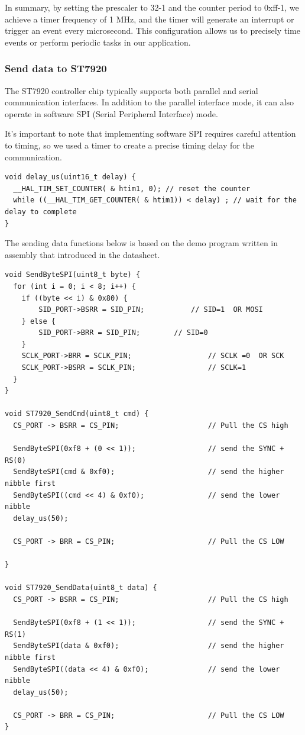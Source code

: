 \documentclass[a4paper, twoside]{report}
\begin{document}
In summary, by setting the prescaler to 32-1 and the counter period to 0xff-1, we achieve a timer frequency of 1 MHz, and the timer will generate an interrupt or trigger an event every microsecond. This configuration allows us to precisely time events or perform periodic tasks in our application.

\subsubsection{Send data to ST7920}
The ST7920 controller chip typically supports both parallel and serial communication interfaces. In addition to the parallel interface mode, it can also operate in software SPI (Serial Peripheral Interface) mode.

It's important to note that implementing software SPI requires careful attention to timing, so we used a timer to create a precise timing delay for the communication.
\begin{verbatim}
void delay_us(uint16_t delay) {
  __HAL_TIM_SET_COUNTER( & htim1, 0); // reset the counter
  while ((__HAL_TIM_GET_COUNTER( & htim1)) < delay) ; // wait for the delay to complete
}
\end{verbatim}

The sending data functions below is based on the demo program written in assembly that introduced in the datasheet. 
\begin{verbatim}
void SendByteSPI(uint8_t byte) {
  for (int i = 0; i < 8; i++) {
    if ((byte << i) & 0x80) {
    	SID_PORT->BSRR = SID_PIN;           // SID=1  OR MOSI
    } else {
    	SID_PORT->BRR = SID_PIN;        // SID=0
    }
    SCLK_PORT->BRR = SCLK_PIN;                  // SCLK =0  OR SCK
    SCLK_PORT->BSRR = SCLK_PIN;                 // SCLK=1
  }
}

void ST7920_SendCmd(uint8_t cmd) {
  CS_PORT -> BSRR = CS_PIN;                     // Pull the CS high

  SendByteSPI(0xf8 + (0 << 1));                 // send the SYNC + RS(0)
  SendByteSPI(cmd & 0xf0);                      // send the higher nibble first
  SendByteSPI((cmd << 4) & 0xf0);               // send the lower nibble
  delay_us(50);

  CS_PORT -> BRR = CS_PIN;                      // Pull the CS LOW

}

void ST7920_SendData(uint8_t data) {
  CS_PORT -> BSRR = CS_PIN;                     // Pull the CS high

  SendByteSPI(0xf8 + (1 << 1));                 // send the SYNC + RS(1)
  SendByteSPI(data & 0xf0);                     // send the higher nibble first
  SendByteSPI((data << 4) & 0xf0);              // send the lower nibble
  delay_us(50);

  CS_PORT -> BRR = CS_PIN;                      // Pull the CS LOW
}
\end{verbatim}
\end{document}
